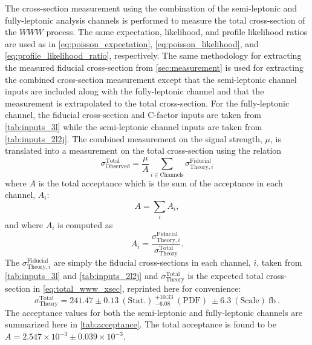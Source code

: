 The cross-section measurement using the combination of the semi-leptonic
and fully-leptonic analysis channels is performed to 
measure the total cross-section of the $WWW$ process. 
The same expectation, likelihood, and profile likelihood
ratios are used as in \eqn\eqref{eq:poisson_expectation},
\eqn\eqref{eq:poisson_likelihood}, and
\eqn\eqref{eq:profile_likelihood_ratio}, respectively.
The same methodology for extracting the measured fiducial
cross-section from
\sec\ref{sec:measurement} is used for extracting the combined
cross-section measurement except that the semi-leptonic channel
inputs are included along with the fully-leptonic channel
and that the measurement is extrapolated to the total
cross-section.
For the fully-leptonic channel,
the fiducial cross-section and C-factor inputs 
are taken from \tab\ref{tab:inputs_3l}
while the semi-leptonic channel inputs are taken from 
\tab\ref{tab:inputs_2l2j}.
The combined measurement on the signal strength, $\mu$, is translated
into a measurement on the total cross-section using the relation
\begin{equation}
\sigma^{\textrm{Total}}_{\textrm{Observed}} = \frac{\mu}{A} \sum_{i\in \textrm{Channels}} \sigma^{\textrm{Fiducial}}_{\textrm{Theory},i}
\label{eq:sigmatot}
\end{equation}
where $A$ is the total acceptance which is the sum of the 
acceptance in each channel, $A_i$:
\begin{equation}
A = \sum_i A_i, 
\end{equation}
and where $A_i$ is computed as
\begin{equation}
A_i = \frac{ \sigma^{\textrm{Fiducial}}_{\textrm{Theory},i} }{ \sigma^{\textrm{Total}}_{\textrm{Theory}}}.
\end{equation}
The $\sigma^{\textrm{Fiducial}}_{\textrm{Theory},i} $ are simply the fiducial
cross-sections in each channel, $i$,  taken from
\tab\ref{tab:inputs_3l} and \tab\ref{tab:inputs_2l2j}
and $\sigma^{\textrm{Total}}_{\textrm{Theory}}$ is the expected total cross-section
in \eqn\eqref{eq:total_www_xsec}, reprinted here for convenience:
\begin{equation}
\sigma^{\textrm{Total}}_{\textrm{Theory}}= 241.47\pm0.13 ~(\textrm{Stat.}) ~^{+10.33}_{-6.08} ~(\textrm{PDF}) ~\pm 6.3 ~(\textrm{Scale}) ~\textrm{fb} ~.
\end{equation}
The acceptance values for both the semi-leptonic and fully-leptonic channels 
are summarized here in \tab\ref{tab:acceptance}.
The total acceptance is found to be $A = 2.547 \times 10^{-3} \pm 0.039 \times 10^{-3}$.


